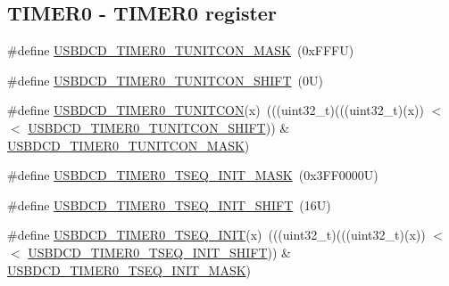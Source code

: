 \subsection*{T\+I\+M\+E\+R0 -\/ T\+I\+M\+E\+R0 register}
\begin{DoxyCompactItemize}
\item 
\#define \mbox{\hyperlink{group___u_s_b_d_c_d___register___masks_ga21cf0206b969eecd876b5b612ca33f9e}{U\+S\+B\+D\+C\+D\+\_\+\+T\+I\+M\+E\+R0\+\_\+\+T\+U\+N\+I\+T\+C\+O\+N\+\_\+\+M\+A\+SK}}~(0x\+F\+F\+F\+U)
\item 
\#define \mbox{\hyperlink{group___u_s_b_d_c_d___register___masks_ga4a35e4b1c280e2a888b8505ab2009370}{U\+S\+B\+D\+C\+D\+\_\+\+T\+I\+M\+E\+R0\+\_\+\+T\+U\+N\+I\+T\+C\+O\+N\+\_\+\+S\+H\+I\+FT}}~(0\+U)
\item 
\#define \mbox{\hyperlink{group___u_s_b_d_c_d___register___masks_gad525be70f6473a29d051b39335f48b0c}{U\+S\+B\+D\+C\+D\+\_\+\+T\+I\+M\+E\+R0\+\_\+\+T\+U\+N\+I\+T\+C\+ON}}(x)~(((uint32\+\_\+t)(((uint32\+\_\+t)(x)) $<$$<$ \mbox{\hyperlink{group___u_s_b_d_c_d___register___masks_ga4a35e4b1c280e2a888b8505ab2009370}{U\+S\+B\+D\+C\+D\+\_\+\+T\+I\+M\+E\+R0\+\_\+\+T\+U\+N\+I\+T\+C\+O\+N\+\_\+\+S\+H\+I\+FT}})) \& \mbox{\hyperlink{group___u_s_b_d_c_d___register___masks_ga21cf0206b969eecd876b5b612ca33f9e}{U\+S\+B\+D\+C\+D\+\_\+\+T\+I\+M\+E\+R0\+\_\+\+T\+U\+N\+I\+T\+C\+O\+N\+\_\+\+M\+A\+SK}})
\item 
\#define \mbox{\hyperlink{group___u_s_b_d_c_d___register___masks_ga2310e6984a2a488e960ca824ddce9ffc}{U\+S\+B\+D\+C\+D\+\_\+\+T\+I\+M\+E\+R0\+\_\+\+T\+S\+E\+Q\+\_\+\+I\+N\+I\+T\+\_\+\+M\+A\+SK}}~(0x3\+F\+F0000\+U)
\item 
\#define \mbox{\hyperlink{group___u_s_b_d_c_d___register___masks_gaa7db9a795f782afd4b38408bc23b4b49}{U\+S\+B\+D\+C\+D\+\_\+\+T\+I\+M\+E\+R0\+\_\+\+T\+S\+E\+Q\+\_\+\+I\+N\+I\+T\+\_\+\+S\+H\+I\+FT}}~(16\+U)
\item 
\#define \mbox{\hyperlink{group___u_s_b_d_c_d___register___masks_ga87e981b43bb55f4fdf60d88f85bc31ad}{U\+S\+B\+D\+C\+D\+\_\+\+T\+I\+M\+E\+R0\+\_\+\+T\+S\+E\+Q\+\_\+\+I\+N\+IT}}(x)~(((uint32\+\_\+t)(((uint32\+\_\+t)(x)) $<$$<$ \mbox{\hyperlink{group___u_s_b_d_c_d___register___masks_gaa7db9a795f782afd4b38408bc23b4b49}{U\+S\+B\+D\+C\+D\+\_\+\+T\+I\+M\+E\+R0\+\_\+\+T\+S\+E\+Q\+\_\+\+I\+N\+I\+T\+\_\+\+S\+H\+I\+FT}})) \& \mbox{\hyperlink{group___u_s_b_d_c_d___register___masks_ga2310e6984a2a488e960ca824ddce9ffc}{U\+S\+B\+D\+C\+D\+\_\+\+T\+I\+M\+E\+R0\+\_\+\+T\+S\+E\+Q\+\_\+\+I\+N\+I\+T\+\_\+\+M\+A\+SK}})
\end{DoxyCompactItemize}
